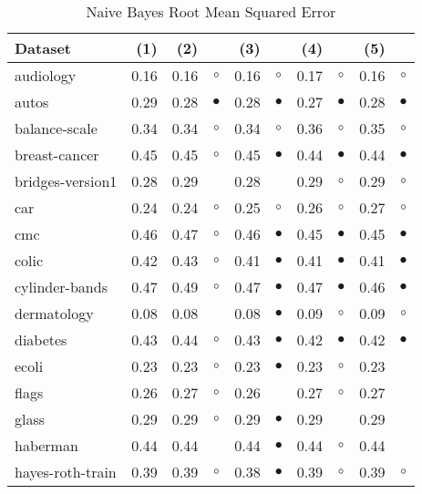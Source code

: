 \newpage
{\centering \footnotesize \begin{longtable}{lrr@{\hspace{0.1cm}}cr@{\hspace{0.1cm}}cr@{\hspace{0.1cm}}cr@{\hspace{0.1cm}}c}
\caption{\label{nbrmse}Naive Bayes Root Mean Squared Error}
\\
\hline
Dataset & (1)& (2) & & (3) & & (4) & & (5) & \\
\hline
audiology & 0.16 & 0.16 &   $\circ$ & 0.16 &   $\circ$ & 0.17 &   $\circ$ & 0.16 &    $\circ$\\
autos & 0.29 & 0.28 & $\bullet$ & 0.28 & $\bullet$ & 0.27 & $\bullet$ & 0.28 &  $\bullet$\\
balance-scale & 0.34 & 0.34 &   $\circ$ & 0.34 &   $\circ$ & 0.36 &   $\circ$ & 0.35 &    $\circ$\\
breast-cancer & 0.45 & 0.45 &   $\circ$ & 0.45 & $\bullet$ & 0.44 & $\bullet$ & 0.44 &  $\bullet$\\
bridges-version1 & 0.28 & 0.29 &           & 0.28 &           & 0.29 &   $\circ$ & 0.29 &    $\circ$\\
car & 0.24 & 0.24 &   $\circ$ & 0.25 &   $\circ$ & 0.26 &   $\circ$ & 0.27 &    $\circ$\\
cmc & 0.46 & 0.47 &   $\circ$ & 0.46 & $\bullet$ & 0.45 & $\bullet$ & 0.45 &  $\bullet$\\
colic & 0.42 & 0.43 &   $\circ$ & 0.41 & $\bullet$ & 0.41 & $\bullet$ & 0.41 &  $\bullet$\\
cylinder-bands & 0.47 & 0.49 &   $\circ$ & 0.47 & $\bullet$ & 0.47 & $\bullet$ & 0.46 &  $\bullet$\\
dermatology & 0.08 & 0.08 &           & 0.08 & $\bullet$ & 0.09 &   $\circ$ & 0.09 &    $\circ$\\
diabetes & 0.43 & 0.44 &   $\circ$ & 0.43 & $\bullet$ & 0.42 & $\bullet$ & 0.42 &  $\bullet$\\
ecoli & 0.23 & 0.23 &   $\circ$ & 0.23 & $\bullet$ & 0.23 &   $\circ$ & 0.23 &           \\
flags & 0.26 & 0.27 &   $\circ$ & 0.26 &           & 0.27 &   $\circ$ & 0.27 &           \\
glass & 0.29 & 0.29 &   $\circ$ & 0.29 & $\bullet$ & 0.29 &           & 0.29 &           \\
haberman & 0.44 & 0.44 &           & 0.44 & $\bullet$ & 0.44 &   $\circ$ & 0.44 &           \\
hayes-roth-train & 0.39 & 0.39 &   $\circ$ & 0.38 & $\bullet$ & 0.39 &   $\circ$ & 0.39 &    $\circ$\\

\end{longtable}}
